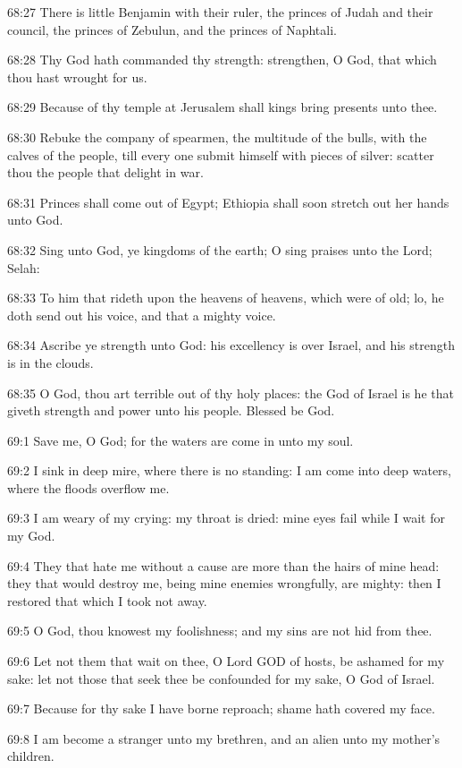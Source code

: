 68:27 There is little Benjamin with their ruler, the princes of Judah and their council, the princes of Zebulun, and the princes of Naphtali.

68:28 Thy God hath commanded thy strength: strengthen, O God, that which thou hast wrought for us.

68:29 Because of thy temple at Jerusalem shall kings bring presents unto thee.

68:30 Rebuke the company of spearmen, the multitude of the bulls, with the calves of the people, till every one submit himself with pieces of silver: scatter thou the people that delight in war.

68:31 Princes shall come out of Egypt; Ethiopia shall soon stretch out her hands unto God.

68:32 Sing unto God, ye kingdoms of the earth; O sing praises unto the Lord; Selah:

68:33 To him that rideth upon the heavens of heavens, which were of old; lo, he doth send out his voice, and that a mighty voice.

68:34 Ascribe ye strength unto God: his excellency is over Israel, and his strength is in the clouds.

68:35 O God, thou art terrible out of thy holy places: the God of Israel is he that giveth strength and power unto his people. Blessed be God.



69:1 Save me, O God; for the waters are come in unto my soul.

69:2 I sink in deep mire, where there is no standing: I am come into deep waters, where the floods overflow me.

69:3 I am weary of my crying: my throat is dried: mine eyes fail while I wait for my God.

69:4 They that hate me without a cause are more than the hairs of mine head: they that would destroy me, being mine enemies wrongfully, are mighty: then I restored that which I took not away.

69:5 O God, thou knowest my foolishness; and my sins are not hid from thee.

69:6 Let not them that wait on thee, O Lord GOD of hosts, be ashamed for my sake: let not those that seek thee be confounded for my sake, O God of Israel.

69:7 Because for thy sake I have borne reproach; shame hath covered my face.

69:8 I am become a stranger unto my brethren, and an alien unto my mother's children.

